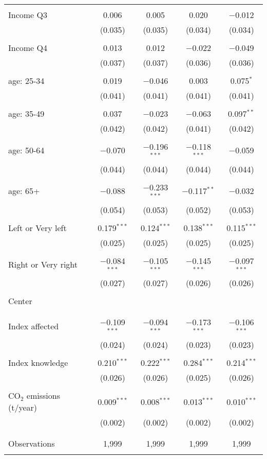 \begin{tabular}{@{\extracolsep{5pt}}lcccc}
  & & & & \\ 
 Income Q3 & 0.006 & 0.005 & 0.020 & $-$0.012 \\ 
  & (0.035) & (0.035) & (0.034) & (0.034) \\ 
  & & & & \\ 
 Income Q4 & 0.013 & 0.012 & $-$0.022 & $-$0.049 \\ 
  & (0.037) & (0.037) & (0.036) & (0.036) \\ 
  & & & & \\ 
 age: 25-34 & 0.019 & $-$0.046 & 0.003 & 0.075$^{*}$ \\ 
  & (0.041) & (0.041) & (0.041) & (0.041) \\ 
  & & & & \\ 
 age: 35-49 & 0.037 & $-$0.023 & $-$0.063 & 0.097$^{**}$ \\ 
  & (0.042) & (0.042) & (0.041) & (0.042) \\ 
  & & & & \\ 
 age: 50-64 & $-$0.070 & $-$0.196$^{***}$ & $-$0.118$^{***}$ & $-$0.059 \\ 
  & (0.044) & (0.044) & (0.044) & (0.044) \\ 
  & & & & \\ 
 age: 65+ & $-$0.088 & $-$0.233$^{***}$ & $-$0.117$^{**}$ & $-$0.032 \\ 
  & (0.054) & (0.053) & (0.052) & (0.053) \\ 
  & & & & \\ 
 Left or Very left & 0.179$^{***}$ & 0.124$^{***}$ & 0.138$^{***}$ & 0.115$^{***}$ \\ 
  & (0.025) & (0.025) & (0.025) & (0.025) \\ 
  & & & & \\ 
 Right or Very right & $-$0.084$^{***}$ & $-$0.105$^{***}$ & $-$0.145$^{***}$ & $-$0.097$^{***}$ \\ 
  & (0.027) & (0.027) & (0.026) & (0.026) \\ 
  & & & & \\ 
 Center &  &  &  &  \\ 
  &  &  &  &  \\ 
  & & & & \\ 
 Index affected & $-$0.109$^{***}$ & $-$0.094$^{***}$ & $-$0.173$^{***}$ & $-$0.106$^{***}$ \\ 
  & (0.024) & (0.024) & (0.023) & (0.023) \\ 
  & & & & \\ 
 Index knowledge & 0.210$^{***}$ & 0.222$^{***}$ & 0.284$^{***}$ & 0.214$^{***}$ \\ 
  & (0.026) & (0.026) & (0.025) & (0.026) \\ 
  & & & & \\ 
 CO$_{2}$ emissions (t/year) & 0.009$^{***}$ & 0.008$^{***}$ & 0.013$^{***}$ & 0.010$^{***}$ \\ 
  & (0.002) & (0.002) & (0.002) & (0.002) \\ 
  & & & & \\ 
\hline \\[-1.8ex] 

Observations & 1,999 & 1,999 & 1,999 & 1,999 \\ 
\hline 
\hline \\[-1.8ex] 
\end{tabular} 